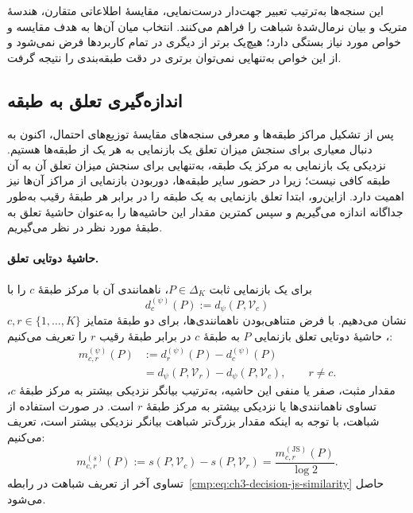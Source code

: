 این سنجه‌ها به‌ترتیب تعبیر جهت‌دار درست‌نمایی،
مقایسهٔ اطلاعاتی متقارن، هندسهٔ متریک و بیان نرمال‌شدهٔ
شباهت را فراهم می‌کنند. انتخاب میان آن‌ها به هدف
مقایسه و خواص مورد نیاز بستگی دارد؛ هیچ‌یک برتر از
دیگری در تمام کاربردها فرض نمی‌شود و از این خواص
به‌تنهایی نمی‌توان برتری در دقت طبقه‌بندی را نتیجه گرفت.

\subsection{اندازه‌گیری تعلق به طبقه}
\label{cmp:subsec:ch3-general-label-prediction}
پس از تشکیل مراکز طبقه‌ها و معرفی سنجه‌های مقایسهٔ
توزیع‌های احتمال، اکنون به دنبال معیاری برای سنجش
میزان تعلق یک بازنمایی به هر یک از طبقه‌ها هستیم.
نزدیکی یک بازنمایی به مرکز یک طبقه، به‌تنهایی برای
سنجش میزان تعلق آن به آن طبقه کافی نیست؛ زیرا در
حضور سایر طبقه‌ها، دوربودن بازنمایی از مراکز آن‌ها
نیز اهمیت دارد. ازاین‌رو، ابتدا تعلق بازنمایی به یک طبقه را در برابر
هر طبقهٔ رقیب به‌طور جداگانه اندازه می‌گیریم و سپس
کمترین مقدار این حاشیه‌ها را به‌عنوان حاشیهٔ تعلق
به طبقهٔ مورد نظر در نظر می‌گیریم.

\paragraph{حاشیهٔ دوتایی تعلق.}
برای یک بازنمایی ثابت $P\in\Delta_K$، ناهمانندی آن
با مرکز طبقهٔ $c$ را با
\begin{equation}\label{cmp:eq:ch3-fixed-representation-dissimilarity}
d_c^{(\psi)}(P):=d_\psi(P,\mathcal V_c)
\end{equation}
نشان می‌دهیم. با فرض متناهی‌بودن ناهمانندی‌ها،
برای دو طبقهٔ متمایز $c,r\in\{1,\ldots,K\}$،
حاشیهٔ دوتایی تعلق بازنمایی $P$ به طبقهٔ $c$
در برابر طبقهٔ رقیب $r$ را تعریف می‌کنیم:
\begin{equation}\label{cmp:eq:ch3-pairwise-margin}
\boxed{\begin{aligned}
m_{c,r}^{(\psi)}(P)
&:=d_r^{(\psi)}(P)-d_c^{(\psi)}(P)\\
&=d_\psi(P,\mathcal V_r)-d_\psi(P,\mathcal V_c),
\qquad r\ne c.
\end{aligned}}
\end{equation}
مقدار مثبت، صفر یا منفی این حاشیه، به‌ترتیب بیانگر
نزدیکی بیشتر به مرکز طبقهٔ $c$، تساوی ناهمانندی‌ها
یا نزدیکی بیشتر به مرکز طبقهٔ $r$ است.
در صورت استفاده از شباهت، با توجه به اینکه مقدار
بزرگ‌تر شباهت بیانگر نزدیکی بیشتر است، تعریف می‌کنیم:
\begin{equation}\label{cmp:eq:ch3-pairwise-similarity-margin}
\boxed{
m_{c,r}^{(s)}(P):=s(P,\mathcal V_c)-s(P,\mathcal V_r)
=\frac{m_{c,r}^{(\mathrm{JS})}(P)}{\log2}.
}
\end{equation}
تساوی آخر از تعریف شباهت در
رابطه~\eqref{cmp:eq:ch3-decision-js-similarity} حاصل می‌شود.

